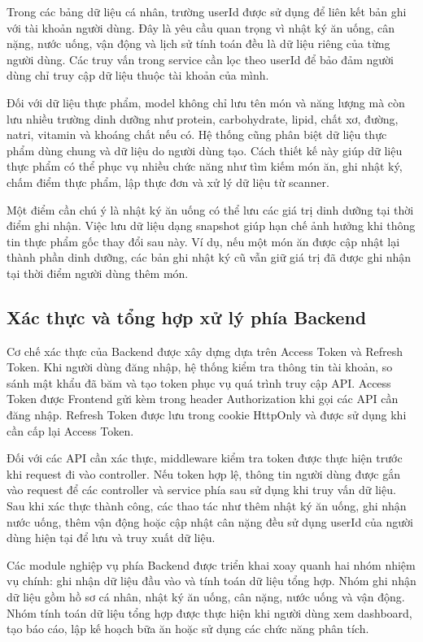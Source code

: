 \documentclass[12pt, a4paper]{report}
\begin{document}
Trong các bảng dữ liệu cá nhân, trường userId được sử dụng để liên kết bản ghi với tài khoản người dùng. Đây là yêu cầu quan trọng vì nhật ký ăn uống, cân nặng, nước uống, vận động và lịch sử tính toán đều là dữ liệu riêng của từng người dùng. Các truy vấn trong service cần lọc theo userId để bảo đảm người dùng chỉ truy cập dữ liệu thuộc tài khoản của mình.

Đối với dữ liệu thực phẩm, model không chỉ lưu tên món và năng lượng mà còn lưu nhiều trường dinh dưỡng như protein, carbohydrate, lipid, chất xơ, đường, natri, vitamin và khoáng chất nếu có. Hệ thống cũng phân biệt dữ liệu thực phẩm dùng chung và dữ liệu do người dùng tạo. Cách thiết kế này giúp dữ liệu thực phẩm có thể phục vụ nhiều chức năng như tìm kiếm món ăn, ghi nhật ký, chấm điểm thực phẩm, lập thực đơn và xử lý dữ liệu từ scanner.

Một điểm cần chú ý là nhật ký ăn uống có thể lưu các giá trị dinh dưỡng tại thời điểm ghi nhận. Việc lưu dữ liệu dạng snapshot giúp hạn chế ảnh hưởng khi thông tin thực phẩm gốc thay đổi sau này. Ví dụ, nếu một món ăn được cập nhật lại thành phần dinh dưỡng, các bản ghi nhật ký cũ vẫn giữ giá trị đã được ghi nhận tại thời điểm người dùng thêm món.

\subsection{Xác thực và tổng hợp xử lý phía Backend}Cơ chế xác thực của Backend được xây dựng dựa trên Access Token và Refresh Token. Khi người dùng đăng nhập, hệ thống kiểm tra thông tin tài khoản, so sánh mật khẩu đã băm và tạo token phục vụ quá trình truy cập API. Access Token được Frontend gửi kèm trong header Authorization khi gọi các API cần đăng nhập. Refresh Token được lưu trong cookie HttpOnly và được sử dụng khi cần cấp lại Access Token.

Đối với các API cần xác thực, middleware kiểm tra token được thực hiện trước khi request đi vào controller. Nếu token hợp lệ, thông tin người dùng được gắn vào request để các controller và service phía sau sử dụng khi truy vấn dữ liệu. Sau khi xác thực thành công, các thao tác như thêm nhật ký ăn uống, ghi nhận nước uống, thêm vận động hoặc cập nhật cân nặng đều sử dụng userId của người dùng hiện tại để lưu và truy xuất dữ liệu.

Các module nghiệp vụ phía Backend được triển khai xoay quanh hai nhóm nhiệm vụ chính: ghi nhận dữ liệu đầu vào và tính toán dữ liệu tổng hợp. Nhóm ghi nhận dữ liệu gồm hồ sơ cá nhân, nhật ký ăn uống, cân nặng, nước uống và vận động. Nhóm tính toán dữ liệu tổng hợp được thực hiện khi người dùng xem dashboard, tạo báo cáo, lập kế hoạch bữa ăn hoặc sử dụng các chức năng phân tích.
\end{document}
